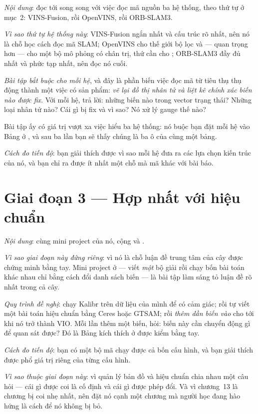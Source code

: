 \documentclass[../../vslam.tex]{subfiles}
\begin{document}
\emph{Nội dung}: đọc  tới  song song với việc đọc mã nguồn ba hệ thống, theo thứ tự ở  mục~2: VINS-Fusion, rồi OpenVINS, rồi ORB-SLAM3.

\emph{Vì sao thứ tự hệ thống này}: VINS-Fusion ngắn nhất và cấu trúc rõ nhất, nên nó là chỗ học cách đọc mã SLAM; OpenVINS cho thế giới bộ lọc và --- quan trọng hơn --- cho một bộ mô phỏng có chân trị, thứ cần cho ; ORB-SLAM3 đầy đủ nhất và phức tạp nhất, nên đọc nó cuối.

\emph{Bài tập bắt buộc cho mỗi hệ}, và đây là phần biến việc đọc mã từ tiêu thụ thụ động thành một việc có sản phẩm: \emph{vẽ lại đồ thị nhân tử và liệt kê chính xác biến nào được fix}. Với mỗi hệ, trả lời: những biến nào trong vector trạng thái? Những loại nhân tử nào? Cái gì bị fix và vì sao? Nó xử lý gauge thế nào?

Bài tập ấy có giá trị vượt xa việc hiểu ba hệ thống: nó buộc bạn đặt mỗi hệ vào Bảng ở , và sau ba lần bạn sẽ thấy chúng là ba ô của cùng một bảng.

\emph{Cách đo tiến độ}: bạn giải thích được vì sao mỗi hệ đưa ra các lựa chọn kiến trúc của nó, và bạn chỉ ra được ít nhất một chỗ mà mã khác với bài báo.

\section{Giai đoạn 3 --- Hợp nhất với hiệu chuẩn}

\emph{Nội dung}:  cùng mini project của nó, cộng  và .

\emph{Vì sao giai đoạn này đứng riêng}: vì nó là chỗ luận đề trung tâm của cây được chứng minh bằng tay. Mini project ở  --- viết \emph{một} bộ giải rồi chạy bốn bài toán khác nhau chỉ bằng cách đổi danh sách biến --- là bài tập làm sáng tỏ luận đề rõ nhất trong cả cây.

\emph{Quy trình đề nghị}: chạy Kalibr trên dữ liệu của mình để có cảm giác; rồi tự viết một bài toán hiệu chuẩn bằng Ceres hoặc GTSAM; rồi \emph{thêm dần biến vào} cho tới khi nó trở thành VIO. Mỗi lần thêm một biến, hỏi: biến này cần chuyển động gì để quan sát được? Đó là Bảng kích thích ở  được kiểm bằng tay.

\emph{Cách đo tiến độ}: bạn có một bộ mã chạy được cả bốn cấu hình, và bạn giải thích được phổ giá trị riêng của từng cấu hình.

\emph{Vì sao  thuộc giai đoạn này}: vì quản lý bản đồ và hiệu chuẩn chia nhau một câu hỏi --- cái gì được coi là cố định và cái gì được phép đổi. Và vì chương~13 là chương bị coi nhẹ nhất, nên đặt nó cạnh một chương mà người học đang hào hứng là cách để nó không bị bỏ.
\end{document}
